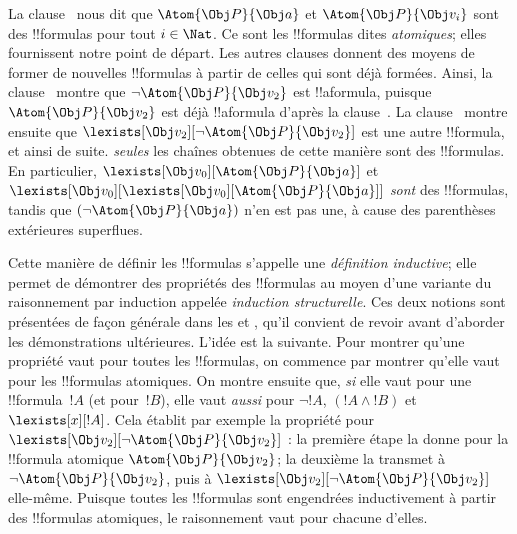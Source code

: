 \documentclass[../../../include/open-logic-section]{subfiles}
\begin{document}
La clause~ nous dit que $\Atom{\Obj P}{\Obj a}$ et
$\Atom{\Obj P}{\Obj v_i}$ sont des !!{formula}s pour tout
$i \in \Nat$. Ce sont les !!{formula}s dites \emph{atomiques}; elles
fournissent notre point de départ. Les autres clauses donnent des
moyens de former de nouvelles !!{formula}s à partir de celles qui sont
déjà formées. Ainsi, la clause~ montre que
$\lnot \Atom{\Obj P}{\Obj v_2}$ est !!a{formula}, puisque
$\Atom{\Obj P}{\Obj v_2}$ est déjà !!a{formula} d'après la
clause~. La clause~ montre ensuite que
$\lexists[\Obj v_2][\lnot \Atom{\Obj P}{\Obj v_2}]$ est une autre
!!{formula}, et ainsi de suite.
\emph{seules} les chaînes obtenues de cette manière sont des
!!{formula}s. En particulier,
$\lexists[\Obj v_0][\Atom{\Obj P}{\Obj a}]$ et
$\lexists[\Obj v_0][\lexists[\Obj v_0][\Atom{\Obj P}{\Obj a}]]$
\emph{sont} des !!{formula}s, tandis que
$(\lnot \Atom{\Obj P}{\Obj a})$ n'en est pas une, à cause des
parenthèses extérieures superflues.

Cette manière de définir les !!{formula}s s'appelle une
\emph{définition inductive}; elle permet de démontrer des propriétés des
!!{formula}s au moyen d'une variante du raisonnement par induction
appelée \emph{induction structurelle}. Ces deux notions sont présentées
de façon générale dans les  et
, qu'il convient de revoir avant d'aborder
les démonstrations ultérieures. L'idée est la suivante. Pour montrer
qu'une propriété vaut pour toutes les !!{formula}s, on commence par
montrer qu'elle vaut pour les !!{formula}s atomiques. On montre ensuite
que, \emph{si} elle vaut pour une !!{formula}~$!A$ (et pour~$!B$),
elle vaut \emph{aussi} pour $\lnot !A$, $(!A \land !B)$ et
$\lexists[x][!A]$. Cela établit par exemple la propriété pour
$\lexists[\Obj v_2][\lnot \Atom{\Obj P}{\Obj v_2}]$ : la première
étape la donne pour la !!{formula} atomique
$\Atom{\Obj P}{\Obj v_2}$; la deuxième la transmet à
$\lnot \Atom{\Obj P}{\Obj v_2}$, puis à
$\lexists[\Obj v_2][\lnot \Atom{\Obj P}{\Obj v_2}]$ elle-même.
Puisque toutes les !!{formula}s sont engendrées inductivement à partir
des !!{formula}s atomiques, le raisonnement vaut pour chacune d'elles.
\end{document}
